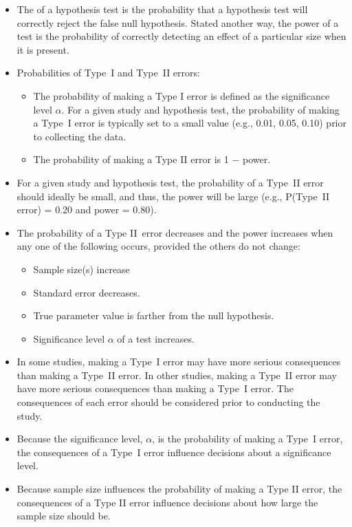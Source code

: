 \begin{itemize}
\item The  of a hypothesis test is the probability that a hypothesis test will
correctly reject the false null hypothesis.  Stated another way, the power of a test is the probability of correctly detecting an effect of a particular size when it is present.
 

\item Probabilities of Type~I and Type~II errors:  \vspace{-1mm}
\begin{itemize}
\item The probability of making a Type I error is defined as the significance level $\alpha$. For a given study and hypothesis test, the probability of making a Type~I error is
typically set to a small value (e.g., 0.01, 0.05, 0.10) prior to collecting the data.
\item The probability of making a Type II error is 1 $-$ power.
\end{itemize}

\item For a given study and hypothesis test, the probability of a Type~II error should
ideally be small, and thus, the power will be large (e.g., P(Type~II error) = 0.20 and
power = 0.80). 

\item The probability of a Type II~error decreases and the power increases
when any one of the following occurs, provided the others do not change:
\begin{itemize}\vspace{-1mm}
\setlength{\itemsep}{0mm}
\item[i. ] Sample size(s) increase
\item[ii. ] Standard error decreases.
\item[iii. ] True parameter value is farther from the null hypothesis.
\item[iv. ] Significance level $\alpha$ of a test increases.  
\end{itemize}

\item In some studies, making a Type~I error may have more serious consequences
than making a Type~II error. In other studies, making a Type~II error may have
more serious consequences than making a Type~I error. The consequences of
each error should be considered prior to conducting the study.

\item Because the significance level, $\alpha$, is the probability of making a Type~I error, the
consequences of a Type~I error influence decisions about a significance level.

\item Because sample size influences the probability of making a Type II error, the consequences of a Type II error influence decisions about how large the
sample size should be.

\end{itemize}

